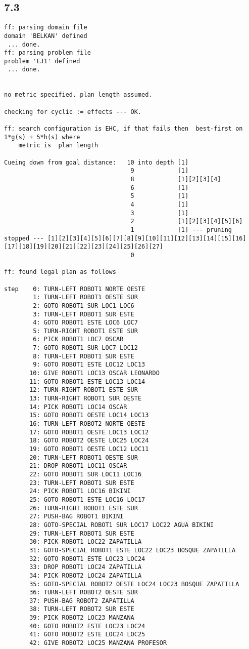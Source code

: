 \documentclass{article}
\begin{document}
\subsection*{7.3}
\begin{lstlisting}
ff: parsing domain file
domain 'BELKAN' defined
 ... done.
ff: parsing problem file
problem 'EJ1' defined
 ... done.


no metric specified. plan length assumed.

checking for cyclic := effects --- OK.

ff: search configuration is EHC, if that fails then  best-first on 1*g(s) + 5*h(s) where
    metric is  plan length

Cueing down from goal distance:   10 into depth [1]
                                   9            [1]
                                   8            [1][2][3][4]
                                   6            [1]
                                   5            [1]
                                   4            [1]
                                   3            [1]
                                   2            [1][2][3][4][5][6]
                                   1            [1] --- pruning stopped --- [1][2][3][4][5][6][7][8][9][10][11][12][13][14][15][16][17][18][19][20][21][22][23][24][25][26][27]
                                   0            

ff: found legal plan as follows

step    0: TURN-LEFT ROBOT1 NORTE OESTE
        1: TURN-LEFT ROBOT1 OESTE SUR
        2: GOTO ROBOT1 SUR LOC1 LOC6
        3: TURN-LEFT ROBOT1 SUR ESTE
        4: GOTO ROBOT1 ESTE LOC6 LOC7
        5: TURN-RIGHT ROBOT1 ESTE SUR
        6: PICK ROBOT1 LOC7 OSCAR
        7: GOTO ROBOT1 SUR LOC7 LOC12
        8: TURN-LEFT ROBOT1 SUR ESTE
        9: GOTO ROBOT1 ESTE LOC12 LOC13
       10: GIVE ROBOT1 LOC13 OSCAR LEONARDO
       11: GOTO ROBOT1 ESTE LOC13 LOC14
       12: TURN-RIGHT ROBOT1 ESTE SUR
       13: TURN-RIGHT ROBOT1 SUR OESTE
       14: PICK ROBOT1 LOC14 OSCAR
       15: GOTO ROBOT1 OESTE LOC14 LOC13
       16: TURN-LEFT ROBOT2 NORTE OESTE
       17: GOTO ROBOT1 OESTE LOC13 LOC12
       18: GOTO ROBOT2 OESTE LOC25 LOC24
       19: GOTO ROBOT1 OESTE LOC12 LOC11
       20: TURN-LEFT ROBOT1 OESTE SUR
       21: DROP ROBOT1 LOC11 OSCAR
       22: GOTO ROBOT1 SUR LOC11 LOC16
       23: TURN-LEFT ROBOT1 SUR ESTE
       24: PICK ROBOT1 LOC16 BIKINI
       25: GOTO ROBOT1 ESTE LOC16 LOC17
       26: TURN-RIGHT ROBOT1 ESTE SUR
       27: PUSH-BAG ROBOT1 BIKINI
       28: GOTO-SPECIAL ROBOT1 SUR LOC17 LOC22 AGUA BIKINI
       29: TURN-LEFT ROBOT1 SUR ESTE
       30: PICK ROBOT1 LOC22 ZAPATILLA
       31: GOTO-SPECIAL ROBOT1 ESTE LOC22 LOC23 BOSQUE ZAPATILLA
       32: GOTO ROBOT1 ESTE LOC23 LOC24
       33: DROP ROBOT1 LOC24 ZAPATILLA
       34: PICK ROBOT2 LOC24 ZAPATILLA
       35: GOTO-SPECIAL ROBOT2 OESTE LOC24 LOC23 BOSQUE ZAPATILLA
       36: TURN-LEFT ROBOT2 OESTE SUR
       37: PUSH-BAG ROBOT2 ZAPATILLA
       38: TURN-LEFT ROBOT2 SUR ESTE
       39: PICK ROBOT2 LOC23 MANZANA
       40: GOTO ROBOT2 ESTE LOC23 LOC24
       41: GOTO ROBOT2 ESTE LOC24 LOC25
       42: GIVE ROBOT2 LOC25 MANZANA PROFESOR
     


\end{lstlisting}
\end{document}
